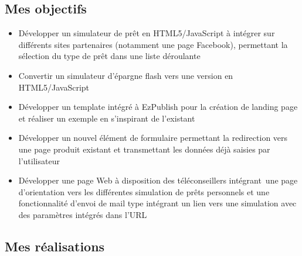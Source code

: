\documentclass[a4paper,11pt,twoside]{report}
\begin{document}
    \subsection*{Mes objectifs}
      \begin{itemize}

	\item Développer un simulateur de prêt en HTML5/JavaScript à intégrer sur différents sites partenaires (notamment une page Facebook), permettant la sélection du type de prêt dans une liste déroulante
	\item Convertir un simulateur d'épargne flash vers une version en HTML5/JavaScript 
	\item Développer un template intégré à EzPublish pour la création de landing page et réaliser un exemple en s'inspirant de l'existant
	\item Développer un nouvel élément de formulaire permettant la redirection vers une page produit existant et transmettant les données déjà saisies par l'utilisateur
 	\item Développer une page Web à disposition des téléconseillers intégrant une page d’orientation vers les différentes simulation de prêts personnels et une fonctionnalité d’envoi de mail type intégrant un lien vers une simulation avec des paramètres intégrés dans l’URL

      \end{itemize}
    \subsection*{Mes réalisations}
\end{document}
